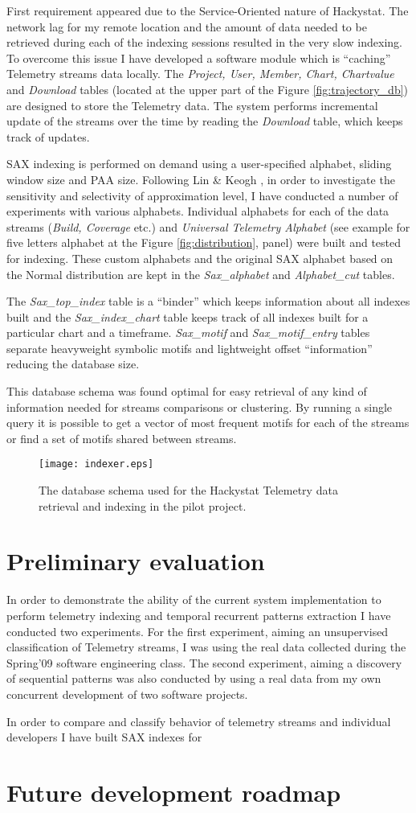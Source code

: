 First requirement appeared due to the Service-Oriented nature of Hackystat. The network lag for my remote location and the amount of data needed to be retrieved during each of the indexing sessions resulted in the very slow indexing. To overcome this issue I have developed a software module which is ``caching'' Telemetry streams data locally. The \textit{Project, User, Member, Chart, Chartvalue} and \textit{Download} tables (located at the upper part of the Figure \ref{fig:trajectory_db}) are designed to store the Telemetry data. The system performs incremental update of the streams over the time by reading the \textit{Download} table, which keeps track of updates.

SAX indexing is performed on demand using a user-specified alphabet, sliding window size and PAA size. Following Lin \& Keogh \cite{citeulike:2821475}, in order to investigate the sensitivity and selectivity of approximation level, I have conducted a number of experiments with various alphabets. Individual alphabets for each of the data streams (\textit{Build, Coverage} etc.) and \textit{Universal Telemetry Alphabet} (see example for five letters alphabet at the Figure \ref{fig:distribution}, panel) were built and tested for indexing. These custom alphabets and the original SAX alphabet based on the Normal distribution are kept in the \textit{Sax\_alphabet} and \textit{Alphabet\_cut} tables. 

The \textit{Sax\_top\_index} table is a ``binder'' which keeps information about all indexes built and the \textit{Sax\_index\_chart} table keeps track of all indexes built for a particular chart and a timeframe. \textit{Sax\_motif} and \textit{Sax\_motif\_entry} tables separate heavyweight symbolic motifs and lightweight offset ``information'' reducing the database size. 

This database schema was found optimal for easy retrieval of any kind of information needed for streams comparisons or clustering. By running a single query it is possible to get a vector of most frequent motifs for each of the streams or find a set of motifs shared between streams.

\begin{figure}[tbp]
   \centering
   \texttt{[image: indexer.eps]}
   \caption{The database schema used for the Hackystat Telemetry data retrieval and indexing in the pilot project.}
   \label{fig:indexer}
\end{figure}

\section{Preliminary evaluation}
In order to demonstrate the ability of the current system implementation to perform telemetry indexing and temporal recurrent patterns extraction I have conducted two experiments. For the first experiment, aiming an unsupervised classification of Telemetry streams, I was using the real data collected during the Spring'09 software engineering class. The second experiment, aiming a discovery of sequential patterns was also conducted by using a real data from my own concurrent development of two software projects.

In order to compare and classify behavior of telemetry streams and individual developers I have built SAX indexes for 

\section{Future development roadmap}
